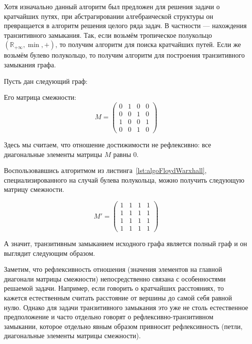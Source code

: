 Хотя изначально данный алгоритм был предложен для решения задачи о кратчайших путях, при абстрагировании алгебраической структуры он превращается в алгоритм решения целого ряда задач. В частности --- нахождения транзитивного замыкания. Так, если возьмём тропическое полукольцо $(\mathbb{R}_{+\infty}, \min, +)$, то получим алгоритм для поиска кратчайших путей. Если же возьмём булево полукольцо, то получим алгоритм для построения транзитивного замыкания графа.

\begin{example}\label{exmpl:transitiveClosure}
  Пусть дан следующий граф:
  \begin{center}
    
  \end{center}

  Его матрица смежности:
  $$ M =
  \begin{pmatrix}
    0 & 1 & 0 & 0 \\
    0 & 0 & 1 & 0 \\
    1 & 0 & 0 & 1 \\
    0 & 0 & 1 & 0
  \end{pmatrix}
  $$

  Здесь мы считаем, что отношение достижимости не рефлексивно: все диагональные элементы матрицы $M$ равны 0.

  Воспользовавшись алгоритмом из листинга~\ref{lst:algoFloydWarxhall}, специализированного на случай булева полукольца, можно получить следующую матрицу смежности.

  $$ M' =
  \begin{pmatrix}
    1 & 1 & 1 & 1 \\
    1 & 1 & 1 & 1 \\
    1 & 1 & 1 & 1 \\
    1 & 1 & 1 & 1
  \end{pmatrix}
  $$

  А значит, транзитивным замыканием исходного графа является полный граф и он выглядит следующим образом.

  \begin{center}
    
  \end{center}

\end{example}

Заметим, что рефлексивность отношения (значения элементов на главной диагонали матрицы смежности) непосредственно связана с особенностями решаемой задачи. Например, если говорить о кратчайших расстояниях, то кажется естественным считать расстояние от вершины до самой себя равной нулю. Однако для задачи транзитивного замыкания это уже не столь естественное предположение и часто отдельно говорят о рефлексивно-транзитивном замыкании, которое отдельно явным образом привносит рефлексивность (петли, диагональные элементы матрицы смежности).

